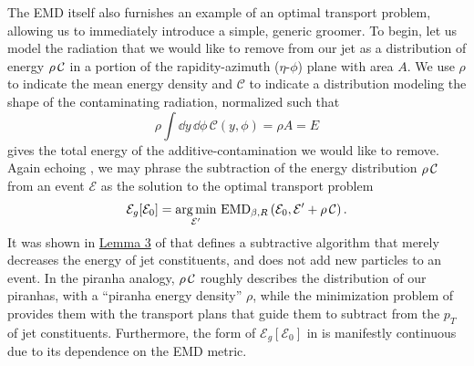 The EMD itself also furnishes an example of an optimal transport problem, allowing us to immediately introduce a simple, generic \PIRANHA{} groomer.
%
To begin, let us model the radiation that we would like to remove from our jet as a distribution of energy \(\rho\,\mathcal{C}\) in a portion of the rapidity-azimuth (\(\eta\)-\(\phi\)) plane with area \(A\).
%
We use \(\rho\) to indicate the mean energy density and \(\mathcal{C}\) to indicate a distribution modeling the shape of the contaminating radiation, normalized such that
\begin{equation}
    \rho\int \dd y\,\dd\phi\,\mathcal{C}(y,\phi) = \rho A = E
\end{equation}
gives the total energy of the \gls{additive-contamination} we would like to remove.
%
Again echoing , we may phrase the subtraction of the energy distribution \(\rho\,\mathcal{C}\) from an event \(\mathcal{E}\) as the solution to the optimal transport problem
\begin{align}
    \label{eq:simple_piranha}
    \mathcal{E}_g[\mathcal E_0] = \underset{\mathcal{E}'}{\arg \min}\ {\rm EMD}_{\beta, R}
    \left(\mathcal{E}_0, \mathcal{E}' + \rhoC\right)
    .
\end{align}
%
It was shown in \href{https://arxiv.org/pdf/2004.04159.pdf#page=33\&zoom=100,0,0}{Lemma 3} of  that  defines a subtractive algorithm that merely decreases the energy of jet constituents, and does not add new particles to an event.
%
In the piranha analogy, \(\rho\,\mathcal{C}\) roughly describes the distribution of our piranhas, with a ``piranha energy density'' \(\rho\), while the minimization problem of  provides them with the transport plans that guide them to subtract from the \(p_T\) of jet constituents.
%
Furthermore, the form of \(\mathcal{E}_g[\mathcal E_0]\) in  is manifestly continuous due to its dependence on the EMD metric.





